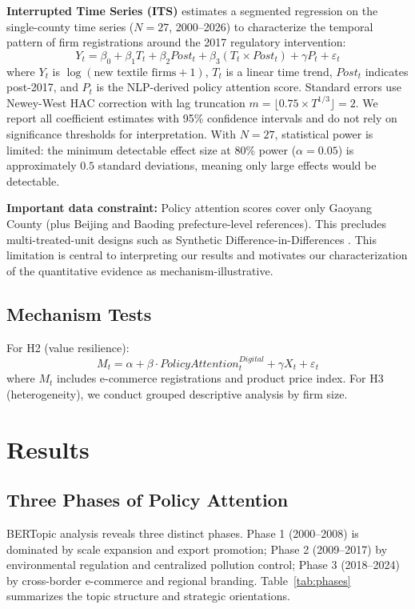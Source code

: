 \documentclass[a4paper, twoside, final]{article}
\begin{document}
\textbf{Interrupted Time Series (ITS)} \citep{Bernal2017} estimates a segmented regression on the single-county time series ($N=27$, 2000--2026) to characterize the temporal pattern of firm registrations around the 2017 regulatory intervention:
\begin{equation}
    Y_t = \beta_0 + \beta_1 T_t + \beta_2 Post_t + \beta_3 (T_t \times Post_t) + \gamma P_t + \varepsilon_t
\end{equation}
where $Y_t$ is $\log(\text{new textile firms} + 1)$, $T_t$ is a linear time trend, $Post_t$ indicates post-2017, and $P_t$ is the NLP-derived policy attention score. Standard errors use Newey-West HAC correction \citep{Newey1987} with lag truncation $m = \lfloor 0.75 \times T^{1/3} \rfloor = 2$. We report all coefficient estimates with 95\% confidence intervals and do not rely on significance thresholds for interpretation. With $N=27$, statistical power is limited: the minimum detectable effect size at 80\% power ($\alpha=0.05$) is approximately $0.5$ standard deviations, meaning only large effects would be detectable.

\textbf{Important data constraint:} Policy attention scores cover only Gaoyang County (plus Beijing and Baoding prefecture-level references). This precludes multi-treated-unit designs such as Synthetic Difference-in-Differences \citep{Arkhangelsky2021}. This limitation is central to interpreting our results and motivates our characterization of the quantitative evidence as mechanism-illustrative.

\subsection{Mechanism Tests}
For H2 (value resilience):
\begin{equation}
    M_t = \alpha + \beta \cdot PolicyAttention^{Digital}_t + \gamma X_t + \varepsilon_t
\end{equation}
where $M_t$ includes e-commerce registrations and product price index. For H3 (heterogeneity), we conduct grouped descriptive analysis by firm size.

\section{Results}\label{sec:results}

\subsection{Three Phases of Policy Attention}
BERTopic analysis reveals three distinct phases. Phase 1 (2000--2008) is dominated by scale expansion and export promotion; Phase 2 (2009--2017) by environmental regulation and centralized pollution control; Phase 3 (2018--2024) by cross-border e-commerce and regional branding. Table~\ref{tab:phases} summarizes the topic structure and strategic orientations.
\end{document}
